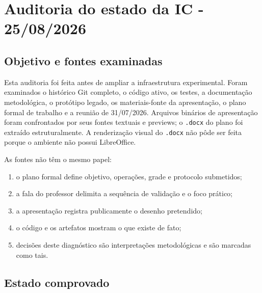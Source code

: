 

\chapter{Auditoria do estado da IC - 25/08/2026}



\section{Objetivo e fontes examinadas}









Esta auditoria foi feita antes de ampliar a infraestrutura experimental. Foram examinados o histórico Git completo, o código ativo, os testes, a documentação metodológica, o protótipo legado, os materiais-fonte da apresentação, o plano formal de trabalho e a reunião de 31/07/2026. Arquivos binários de apresentação foram confrontados por seus fontes textuais e previews; o \texttt{.\allowbreak{}docx} do plano foi extraído estruturalmente. A renderização visual do \texttt{.\allowbreak{}docx} não pôde ser feita porque o ambiente não possui LibreOffice.



As fontes não têm o mesmo papel:


\begin{enumerate}
\item o plano formal define objetivo, operações, grade e protocolo submetidos;
\item a fala do professor delimita a sequência de validação e o foco prático;
\item a apresentação registra publicamente o desenho pretendido;
\item o código e os artefatos mostram o que existe de fato;
\item decisões deste diagnóstico são interpretações metodológicas e são marcadas
como tais.
\end{enumerate}


\section{Estado comprovado}



